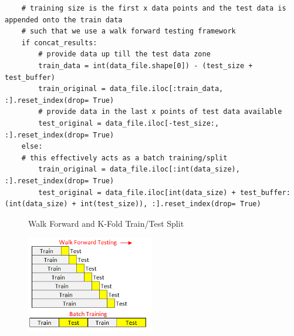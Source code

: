 \documentclass[11pt]{article}
\begin{document}
\begin{lstlisting}
    # training size is the first x data points and the test data is appended onto the train data 
    # such that we use a walk forward testing framework
    if concat_results:
        # provide data up till the test data zone
        train_data = int(data_file.shape[0]) - (test_size + test_buffer)
        train_original = data_file.iloc[:train_data, :].reset_index(drop= True)
        # provide data in the last x points of test data available
        test_original = data_file.iloc[-test_size:, :].reset_index(drop= True)
    else:
	# this effectively acts as a batch training/split
        train_original = data_file.iloc[:int(data_size), :].reset_index(drop= True) 
        test_original = data_file.iloc[int(data_size) + test_buffer: (int(data_size) + int(test_size)), :].reset_index(drop= True)
\end{lstlisting}
\vspace{4mm}
\begin{figure}[h]
    \centering
	\caption{Walk Forward and K-Fold Train/Test Split}    
	\includegraphics[width=0.5\textwidth]{Train_test}
    \label{fig:Train_Test}
     \caption*{}
\end{figure}
\end{document}
